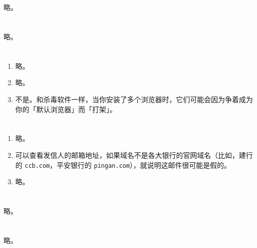 \section{}

略。

\section{}

略。

\section{}

\begin{enumerate}
  \item 略。
  \item 略。
  \item 不是。和杀毒软件一样，当你安装了多个浏览器时，它们可能会因为争着成为你的「默认浏览器」而「打架」。
\end{enumerate}

\section{}

\begin{enumerate}
  \item 略。
  \item 可以查看发信人的邮箱地址，如果域名不是各大银行的官网域名（比如，建行的 \texttt{ccb.com}，平安银行的 \texttt{pingan.com}），就说明这邮件很可能是假的。
  \item 略。
\end{enumerate}

\section{}

略。

\section{}

略。

\section{}

